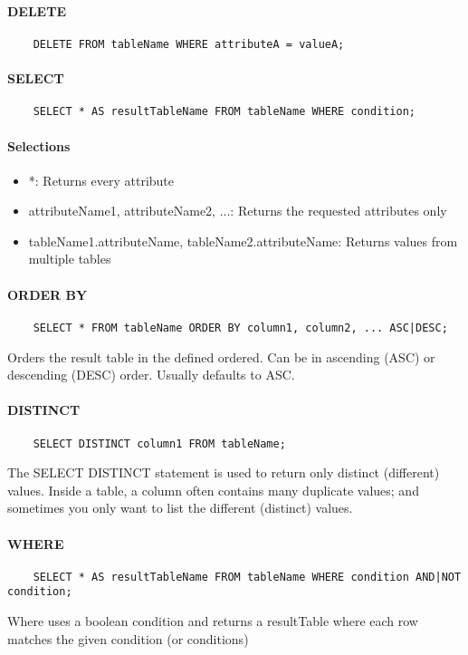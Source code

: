 \paragraph{DELETE}
\begin{verbatim}
    DELETE FROM tableName WHERE attributeA = valueA;
\end{verbatim}

\paragraph{SELECT}
\begin{verbatim}
    SELECT * AS resultTableName FROM tableName WHERE condition;
\end{verbatim}
\paragraph{Selections}
\begin{itemize}
	\item *: Returns every attribute
	\item attributeName1, attributeName2, ...: Returns the requested attributes only
	\item tableName1.attributeName, tableName2.attributeName: Returns values from multiple tables
\end{itemize}
\paragraph{ORDER BY}
\begin{verbatim}
    SELECT * FROM tableName ORDER BY column1, column2, ... ASC|DESC;
\end{verbatim}
Orders the result table in the defined ordered. Can be in ascending (ASC) or descending (DESC) order. Usually defaults to ASC.
\paragraph{DISTINCT}
\begin{verbatim}
    SELECT DISTINCT column1 FROM tableName;
\end{verbatim}
The SELECT DISTINCT statement is used to return only distinct (different) values. Inside a table, a column often contains many duplicate values; and sometimes you only want to list the different (distinct) values.
\paragraph{WHERE}
\begin{verbatim}
    SELECT * AS resultTableName FROM tableName WHERE condition AND|NOT condition;
\end{verbatim}
Where uses a boolean condition and returns a resultTable where each row matches the given condition (or conditions)
